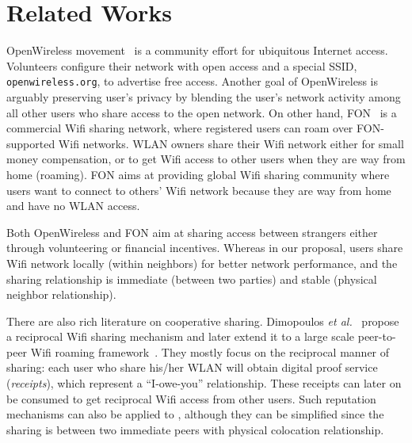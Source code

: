 \section{Related Works}
\label{sec:related}

OpenWireless movement~\cite{openwireless} is a community effort for ubiquitous
Internet access. Volunteers configure their
\wifi{} network with open access and a special SSID, \texttt{openwireless.org},
to advertise free access. Another goal of OpenWireless is arguably preserving
user's privacy by blending the user's network activity among all other users who
share access to the open \wifi{} network. On other hand, FON~\cite{fon} is a
commercial Wifi sharing network, where registered users can roam over
FON-supported Wifi networks. WLAN owners share their Wifi network either for
small money compensation, or to get Wifi access to other users when they are way
from home (roaming). FON aims at providing global Wifi sharing community where
users want to connect to others' Wifi network because they are way from home and
have no WLAN access. 

Both OpenWireless and FON aim at sharing \wifi{} access between strangers either
through volunteering or financial incentives. Whereas in our proposal, users share
Wifi network locally (within neighbors) for better network performance, and the
sharing relationship is immediate (between two parties) and stable (physical
neighbor relationship).

There are also rich literature on cooperative \wifi{} sharing. Dimopoulos
\textit{et al.}~\cite{efstathiou2010controlled} propose a reciprocal Wifi
sharing mechanism and later extend it to a large scale peer-to-peer Wifi
roaming framework~\cite{dimopoulos2010exploiting}. They mostly focus on the
reciprocal manner of sharing: each user who share his/her WLAN will obtain
digital proof service (\textit{receipts}), which represent a ``I-owe-you''
relationship. These receipts can later on be consumed to get reciprocal Wifi
access from other users. Such reputation mechanisms can also be applied to
\wisefi{}, although they can be simplified since the sharing is between two
immediate peers with physical colocation relationship.
